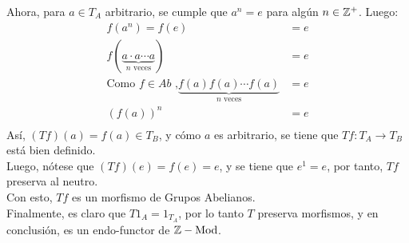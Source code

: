 \begin{example}
    Ahora, para $a\in T_A$ arbitrario, se cumple que $a^n=e$ para algún $n\in\mathbb Z^+$. Luego:
    \begin{align*}
        f(a^n) = f(e) & = e \\
        f\left(\underbrace{a\cdot a \cdots a}_{n \text{ veces}}\right) & = e \\
        \text{Como $f\in Ab$ ,} \underbrace{f(a)f(a)\cdots f(a)}_{n\text{ veces}} & = e \\
        \left(f(a)\right)^n & = e\\
    \end{align*}
    Así, $(Tf)(a)=f(a)\in T_B$, y cómo $a$ es arbitrario, se tiene que $Tf:T_A\to T_B$ está bien definido.\\
    Luego, nótese que $(Tf)(e)=f(e)=e$, y se tiene que $e^1 = e$, por tanto, $Tf$ preserva al neutro.\\
    Con esto, $Tf$ es un morfismo de Grupos Abelianos.\\
    Finalmente, es claro que $T1_A=1_{T_A}$, por lo tanto $T$ preserva morfismos, y en conclusión, es un endo-functor de $\mathbb Z-\mathrm{Mod}$. 
    \end{example}

